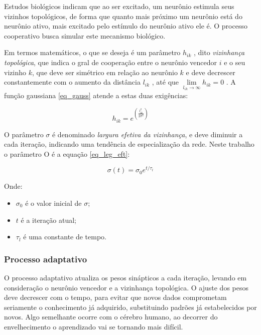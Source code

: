 Estudos biológicos indicam que ao ser excitado, um neurônio estimula seus
vizinhos topológicos, de forma que quanto mais próximo um neurônio está do
neurônio ativo, mais excitado pelo estímulo do neurônio ativo ele é. O processo
cooperativo busca simular este mecanismo biológico.

Em termos matemáticos, o que se deseja é um parâmetro $ h_{ik} $ , dito
\textit{vizinhança topológica}, que indica o gral de cooperação entre o
neurônio vencedor $ i $ e o seu vizinho $ k $, que deve ser simétrico em relação
ao neurônio $ k $ e deve decrescer constantemente com o aumento da
distância $ l_{ik} $ , até que $ \lim\limits_{ l_{ik} \to \infty } h_{ik} = 0 $ .
A função gaussiana \ref{eq_gauss} atende a estas duas exigências:

\begin{equation}\label{eq_gauss}
h_{ik} = e^{ \left( \frac{ l_{ik}^2 }{ 2 \sigma^2 } \right) }
\end{equation}


O parâmetro $ \sigma $ é denominado \textit{largura efetiva da vizinhança},
e deve diminuir a cada iteração, indicando uma tendência de especialização da
rede. Neste trabalho o parâmetro O é a equação \ref{eq_leg_eft}:

\begin{equation}\label{eq_leg_eft}
\sigma(t) = \sigma_0 e^{ t / \tau_l }
\end{equation}

Onde:

\begin{itemize}
\item $ \sigma_0 $ é o valor inicial de $ \sigma $;
\item $ t $ é a iteração atual;
\item $ \tau_l $ é uma constante de tempo.
\end{itemize}

\subsubsection{Processo adaptativo}

O processo adaptativo atualiza os pesos sinápticos a cada iteração, levando em
consideração o neurônio vencedor e a vizinhança topológica. O ajuste dos pesos
deve decrescer com o tempo, para evitar que novos dados comprometam seriamente
o conhecimento já adquirido, substituindo padrões já estabelecidos por novos.
Algo semelhante ocorre com o cérebro humano, ao decorrer do envelhecimento o
aprendizado vai se tornando mais difícil.

